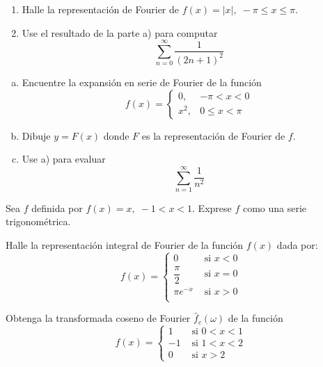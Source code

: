 \documentclass[11pt]{article}
\begin{document}
\begin{question} %
    \begin{enumerate}[ a) ]
    \item Halle la representación de Fourier de $f(x) = |x|, \; -\pi \leq x \leq \pi$.
    \item Use el resultado de la parte a) para computar
        \[ \sum_{n = 0}^{\infty} \frac{1}{(2 n + 1)^2} \]
\end{enumerate}
\end{question}

\begin{question} %
\begin{enumerate}[a)]
\item Encuentre la expansión en serie de Fourier de la función
    \[ f(x) = 
        \begin{cases}
            0,& -\pi < x < 0 \\
            x^2,& 0 \leq x < \pi
        \end{cases} \]
\item Dibuje $y = F(x)$ donde $F$ es la representación de Fourier de $f$.
\item Use a) para evaluar
    \[ \sum_{n = 1}^{\infty} \frac{1}{n^2} \]
\end{enumerate}
\end{question}

\begin{question} %
Sea $f$ definida por $f(x) = x, \; -1 < x < 1$. Exprese $f$ como una serie trigonométrica.
\end{question}

\begin{question} %
Halle la representación integral de Fourier de la función $f(x)$ dada por:
\[ f(x) = 
    \begin{cases}
    0 & \text{ si } x < 0 \\
    \dfrac{\pi}{2} & \text{ si } x = 0 \\
    \pi e^{-x} & \text{ si } x > 0 \\
\end{cases} \]
\end{question}


\begin{question} %
Obtenga la transformada coseno de Fourier $\hat{f}_c(\omega)$ de la función
\[ f(x) = 
\begin{cases}
    1 & \text{ si } 0 < x < 1 \\
    -1 & \text{ si } 1 < x < 2 \\
    0 & \text{ si } x > 2 
\end{cases} \]
\end{question}
\end{document}
